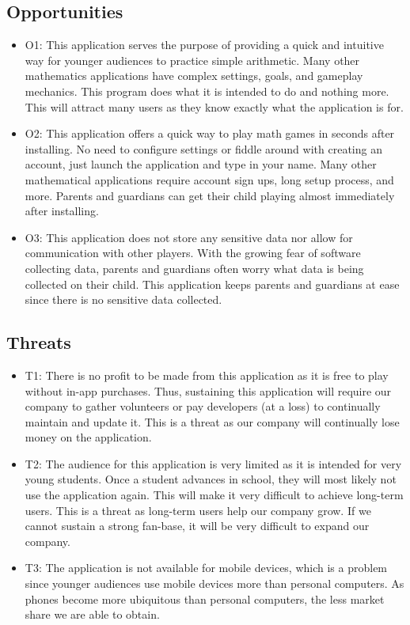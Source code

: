 \documentclass[12pt]{article}
\begin{document}
\subsection{Opportunities}

\begin{itemize}
\item O1: This application serves the purpose of providing a quick and intuitive way for younger audiences to practice simple arithmetic. Many other mathematics applications have complex settings, goals, and gameplay mechanics. This program does what it is intended to do and nothing more. This will attract many users as they know exactly what the application is for.
\item O2: This application offers a quick way to play math games in seconds after installing. No need to configure settings or fiddle around with creating an account, just launch the application and type in your name. Many other mathematical applications require account sign ups, long setup process, and more. Parents and guardians can get their child playing almost immediately after installing. 
\item O3: This application does not store any sensitive data nor allow for communication with other players. With the growing fear of software collecting data, parents and guardians often worry what data is being collected on their child. This application keeps parents and guardians at ease since there is no sensitive data collected. 
\end{itemize}

\subsection{Threats}

\begin{itemize}
\item T1: There is no profit to be made from this application as it is free to play without in-app purchases. Thus, sustaining this application will require our company to gather volunteers or pay developers (at a loss) to continually maintain and update it. This is a threat as our company will continually lose money on the application.
\item T2: The audience for this application is very limited as it is intended for very young students. Once a student advances in school, they will most likely not use the application again. This will make it very difficult to achieve long-term users. This is a threat as long-term users help our company grow. If we cannot sustain a strong fan-base, it will be very difficult to expand our company.  
\item T3: The application is not available for mobile devices, which is a problem since younger audiences use mobile devices more than personal computers. As phones become more ubiquitous than personal computers, the less market share we are able to obtain. 
\end{itemize}
\end{document}
